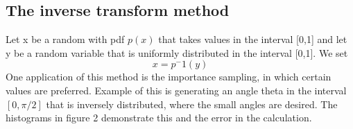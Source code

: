 \subsection{The inverse transform method} 

Let x be a random with pdf $p(x)$ that takes values in the interval [0,1] and let y be a random variable that is uniformly distributed in the interval [0,1]. We set
\begin{equation}
x = p^-1(y)
\end{equation}
One application of this method is the importance sampling, in which certain values are preferred\citep{Weinzierl}. Example of this is generating an angle theta in the interval $[0,\pi/2]$ that is inversely distributed,
where the small angles are desired. The histograms in figure 2 demonstrate this and the error in the calculation.



